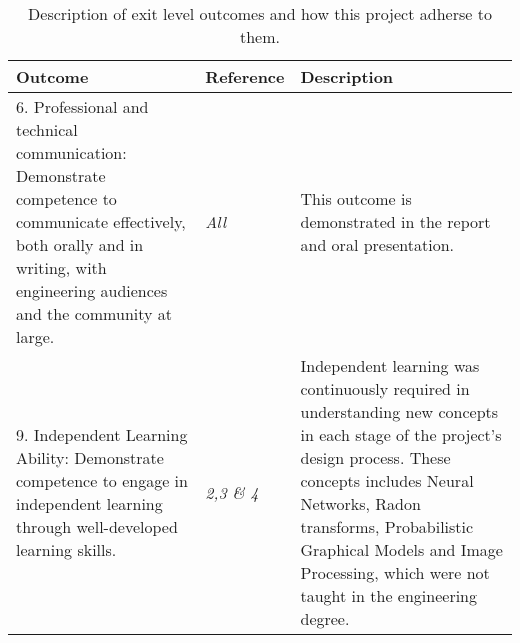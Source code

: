 \begin{table}
\caption{Description of exit level outcomes and how this project adherse to them.} \label{tbl:ECSATable2}
\begin{tabular}{|p{6cm}|p{3cm}|p{6cm}|}
\hline
\textbf{Outcome}&\textbf{Reference}&\textbf{Description}\\
\hline
6. Professional and technical communication: Demonstrate competence to communicate effectively, both orally and
in writing, with engineering audiences and the community at large.&\textit{All}&This outcome is demonstrated in the report and oral presentation.\\
\hline
9. Independent Learning Ability: Demonstrate competence to engage in independent learning through well-developed
learning skills.&\textit{2,3 \& 4}&Independent learning was continuously required in understanding new concepts in each stage of the project's design process. These concepts includes Neural Networks, Radon transforms, Probabilistic Graphical Models and Image Processing, which were not taught in the engineering degree.\\
\hline
\end{tabular}
\end{table}